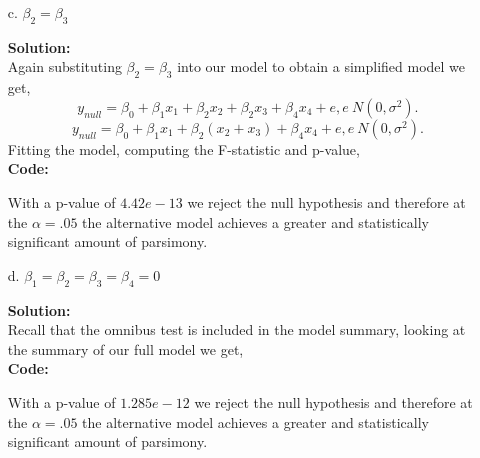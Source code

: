 \documentclass[12pt]{article}
\makeatletter
\theoremstyle{homework}
\newenvironment{exercise}[1]
{\def\@currentlabel{#1}\exercisecore}
{\endexercisecore}
\newcommand{\localhead}[1]{\par\smallskip\noindent\textbf{#1}\nobreak\\}%
\newcommand\solution{\localhead{Solution:}}
\makeatother
\begin{document}
\begin{exercise}{2}
\begin{enumerate}
   \item[c.]$\beta_2 = \beta_3$\\
   \solution Again substituting $\beta_2 = \beta_3$ into our model to obtain a simplified model we get, 
   \begin{equation*}
    y_{null} = \beta_0 + \beta_1x_1 + \beta_2x_2 + \beta_2x_3+ \beta_4x_4 + e, e ~ N(0, \sigma^2).
  \end{equation*}
  \begin{equation*}
    y_{null} = \beta_0 + \beta_1x_1 + \beta_2(x_2 +x_3) + \beta_4x_4 + e, e ~ N(0, \sigma^2).
  \end{equation*}
  Fitting the model, computing the F-statistic and p-value, \\
   \textbf{Code:}
   \begin{center}
   
   \end{center} 
   With a p-value of $4.42e-13$ we reject the null hypothesis and therefore at the $\alpha = .05$ the 
   alternative model achieves a greater and statistically significant amount of parsimony.
   \newpage

   \item[d.] $\beta_1 = \beta_2 = \beta_3 = \beta_4 = 0$\\
   \solution Recall that the omnibus test is included in the model summary, looking at the 
   summary of our full model we get, \\
   \textbf{Code:}
   \begin{center}
   
   \end{center} 
   With a p-value of $1.285e-12$ we reject the null hypothesis and therefore at the $\alpha = .05$ the 
   alternative model achieves a greater and statistically significant amount of parsimony.
   \newpage
  \end{enumerate}  
\end{exercise}
\end{document}
